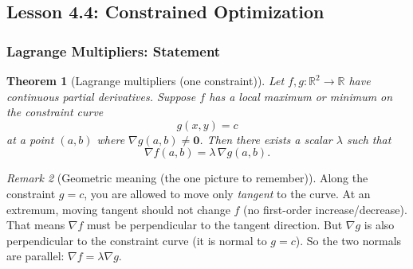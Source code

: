 \documentclass[12pt]{article}
\numberwithin{equation}{section}
\newcommand{\RR}{\mathbb{R}}
\newcommand{\vect}[1]{\boldsymbol{#1}}   %
\theoremstyle{plain}
\newtheorem{theorem}{Theorem}[section]
\theoremstyle{definition}
\theoremstyle{remark}
\newtheorem{remark}[theorem]{Remark}
\begin{document}
\subsection{Lesson 4.4: Constrained Optimization}

\subsubsection{Lagrange Multipliers: Statement}

\begin{theorem}[Lagrange multipliers (one constraint)]\label{thm:lagrange}
Let $f,g:\RR^2\to\RR$ have continuous partial derivatives. Suppose $f$ has a local maximum or minimum on the constraint curve
\[
g(x,y)=c
\]
at a point $(a,b)$ where $\nabla g(a,b)\neq \vect 0$. Then there exists a scalar $\lambda$ such that
\begin{equation}\label{eq:lagrange}
\nabla f(a,b)=\lambda\,\nabla g(a,b).
\end{equation}
\end{theorem}

\begin{remark}[Geometric meaning (the one picture to remember)]
Along the constraint $g=c$, you are allowed to move only \emph{tangent} to the curve.  
At an extremum, moving tangent should not change $f$ (no first-order increase/decrease).  
That means $\nabla f$ must be perpendicular to the tangent direction.  
But $\nabla g$ is also perpendicular to the constraint curve (it is normal to $g=c$).  
So the two normals are parallel: $\nabla f=\lambda \nabla g$.
\end{remark}
\end{document}
